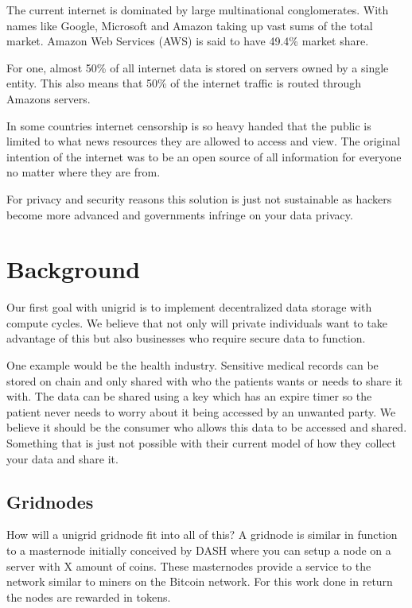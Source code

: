 \documentclass[12pt]{article}
\begin{document}
The current internet is dominated by large multinational conglomerates. With names like Google, Microsoft and Amazon taking up vast sums of the total market. Amazon Web Services (AWS) is said to have 49.4\% market share\cite{jeb2019}.

For one, almost 50\% of all internet data is stored on servers owned by a single entity\cite{jeb2019}. This also means that 50\% of the internet traffic is routed through Amazons servers\cite{jeb2019}. 

In some countries internet censorship is so heavy handed that the public is limited to what news resources they are allowed to access and view\cite{wiki2021}. The original intention of the internet was to be an open source of all information for everyone no matter where they are from.

For privacy and security reasons this solution is just not sustainable as hackers become more advanced and governments infringe on your data privacy.

\section*{Background}
Our first goal with unigrid is to implement decentralized data storage with compute cycles. We believe that not only will private individuals want to take advantage of this but also businesses who require secure data to function. 

One example would be the health industry. Sensitive medical records can be stored on chain and only shared with who the patients wants or needs to share it with. The data can be shared using a key which has an expire timer so the patient never needs to worry about it being accessed by an unwanted party. We believe it should be the consumer who allows this data to be accessed and shared. Something that is just not possible with their current model of how they collect your data and share it.

\subsection*{Gridnodes}


How will a unigrid gridnode fit into all of this? A gridnode is similar in function to a masternode initially conceived by DASH where you can setup a node on a server with X amount of coins. These masternodes provide a service to the network similar to miners on the Bitcoin network. For this work done in return the nodes are rewarded in tokens.
\end{document}
